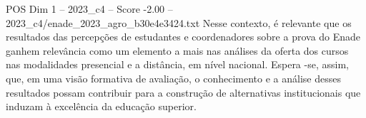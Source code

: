 \begin{textsample}{POS Dim 1 – 2023\_c4 – Score -2.00 – 2023\_c4/enade\_2023\_agro\_b30e4e3424.txt}
Nesse contexto, é relevante que os resultados das percepções de estudantes e coordenadores sobre a prova do Enade ganhem relevância como um elemento a mais nas análises da oferta dos cursos nas modalidades presencial e a distância, em nível nacional.
Espera -se, assim, que, em uma visão formativa de avaliação, o conhecimento e a análise desses resultados possam contribuir para a construção de alternativas institucionais que induzam à excelência da educação superior.

\end{textsample}
